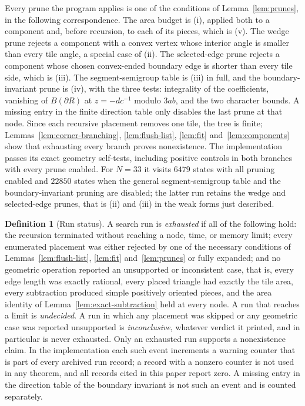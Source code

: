 \documentclass[11pt]{amsart}
\theoremstyle{definition}
\newtheorem{definition}[theorem]{Definition}
\theoremstyle{remark}
\begin{document}
Every prune the program applies is one of the conditions of
Lemma~\ref{lem:prunes}, in the following correspondence.  The area budget is
(i), applied both to a component and, before recursion, to each of its
pieces, which is (v).  The wedge prune rejects a component with a convex
vertex whose interior angle is smaller than every tile angle, a special case
of (ii).  The selected-edge prune rejects a component whose chosen
convex-ended boundary edge is shorter than every tile side, which is (iii).
The segment-semigroup table is (iii) in full, and the boundary-invariant
prune is (iv), with the three tests: integrality of the coefficients,
vanishing of $B(\partial R)$ at $z=-dc^{-1}$ modulo $3ab$, and the two
character bounds.  A missing entry in the finite direction table only
disables the last prune at that node.  Since each recursive placement removes
one tile, the tree is finite; Lemmas~\ref{lem:corner-branching},
\ref{lem:flush-list}, \ref{lem:fit} and~\ref{lem:components} show that
exhausting every branch proves nonexistence.  The implementation passes its
exact geometry self-tests, including positive controls in both branches with
every prune enabled.  For $N=33$ it visits $6479$ states with all pruning
enabled and $22850$ states when the general segment-semigroup table and the
boundary-invariant pruning are disabled; the latter run retains the wedge and
selected-edge prunes, that is (ii) and (iii) in the weak forms just
described.

\begin{definition}[Run status]\label{def:runstatus}
A search run is \emph{exhausted} if all of the following hold: the recursion
terminated without reaching a node, time, or memory limit; every enumerated
placement was either rejected by one of the necessary conditions of
Lemmas~\ref{lem:flush-list}, \ref{lem:fit} and~\ref{lem:prunes} or fully
expanded; and no geometric operation reported an unsupported or inconsistent
case, that is, every edge length was exactly rational, every placed triangle
had exactly the tile area, every subtraction produced simple positively
oriented pieces, and the area identity of
Lemma~\ref{lem:exact-subtraction} held at every node.  A run that reaches a
limit is \emph{undecided}.  A run in which any placement was skipped or any
geometric case was reported unsupported is \emph{inconclusive}, whatever
verdict it printed, and in particular is never exhausted.  Only an exhausted
run supports a nonexistence claim.  In the implementation each such event
increments a warning counter that is part of every archived run record; a
record with a nonzero counter is not used in any theorem, and all records
cited in this paper report zero.  A missing entry in the direction table of
the boundary invariant is not such an event and is counted separately.
\end{definition}
\end{document}
